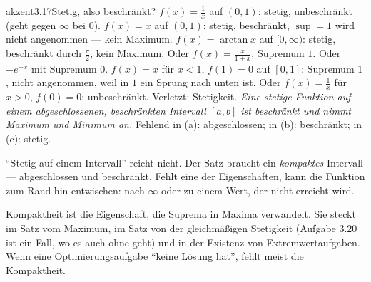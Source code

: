 \stupserzwei{akzent}{$\frac1x$ auf $(0, 1)$: unbeschränkt. $x$ auf $(0, 1)$: Supremum $1$, nie erreicht. $\arctan x$ auf $[0, \infty)$: Supremum $\frac\pi2$, nie erreicht.}{22pt}
\begin{loesungkarte}{akzent}{3.17}{Stetig, also beschränkt?}
$f(x) = \frac1x$ auf $(0, 1)$: stetig, unbeschränkt (geht gegen $\infty$ bei $0$). $f(x) = x$ auf $(0, 1)$: stetig, beschränkt, $\sup = 1$ wird nicht angenommen --- kein Maximum.
$f(x) = \arctan x$ auf $[0, \infty)$: stetig, beschränkt durch $\frac\pi2$, kein Maximum. Oder $f(x) = \frac x{1 + x}$, Supremum $1$. Oder $-e^{-x}$ mit Supremum $0$.
$f(x) = x$ für $x < 1$, $f(1) = 0$ auf $[0, 1]$: Supremum $1$, nicht angenommen, weil in $1$ ein Sprung nach unten ist. Oder $f(x) = \frac1x$ für $x > 0$, $f(0) = 0$: unbeschränkt. Verletzt: Stetigkeit.
\emph{Eine stetige Funktion auf einem abgeschlossenen, beschränkten Intervall $[a, b]$ ist beschränkt und nimmt Maximum und Minimum an.} Fehlend in (a): abgeschlossen; in (b): beschränkt; in (c): stetig.
\begin{fehler}\kastentext
\enquote{Stetig auf einem Intervall} reicht nicht. Der Satz braucht ein \emph{kompaktes} Intervall --- abgeschlossen und beschränkt. Fehlt eine der Eigenschaften, kann die Funktion zum Rand hin entwischen: nach $\infty$ oder zu einem Wert, der nicht erreicht wird.
\end{fehler}
\begin{mitnehmen}\kastentext
Kompaktheit ist die Eigenschaft, die Suprema in Maxima verwandelt. Sie steckt im Satz vom Maximum, im Satz von der gleichmäßigen Stetigkeit (Aufgabe 3.20 ist ein Fall, wo es auch ohne geht) und in der Existenz von Extremwertaufgaben. Wenn eine Optimierungsaufgabe \enquote{keine Lösung hat}, fehlt meist die Kompaktheit.
\end{mitnehmen}
\end{loesungkarte}


